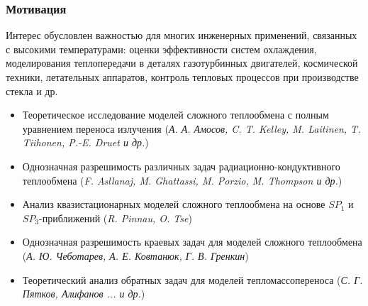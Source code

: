 \begin{frame}
    \setcounter{framenumber}{1}
    \maketitle
\end{frame}


\begin{frame}
    \frametitle{Мотивация}
    Интерес обусловлен важностью для многих
    инженерных применений, связанных с высокими температурами: оценки
    эффективности систем охлаждения, моделирования теплопередачи в деталях
    газотурбинных двигателей, космической техники, летательных аппаратов,
    контроль тепловых процессов при производстве стекла и др.

    \hfill
    \hfill
    \begin{itemize}
        \item Теоретическое исследование моделей сложного теплообмена с
        полным уравнением переноса излучения
        (\textit{А. А. Амосов, C. T. Kelley, M. Laitinen, T. Tiihonen, P.-E. Druet и др.})
        \item Однозначная разрешимость различных задач радиационно-кондуктивного теплообмена
        (\textit{F. Asllanaj, M. Ghattassi, M. Porzio, M. Thompson и др.})
        \item Анализ квазистационарных моделей сложного теплообмена на основе $SP_1$ и $SP_3$-приближений
        (\textit{R. Pinnau, O. Tse})
        \item Однозначная разрешимость краевых задач для моделей сложного теплообмена
        (\textit{А. Ю. Чеботарев, А. Е. Ковтанюк, Г. В. Гренкин})
        \item Теоретический анализ обратных задач для моделей тепломассопереноса
        (\textit{С. Г. Пятков, Алифанов ... и др.})
    \end{itemize}
\end{frame}

